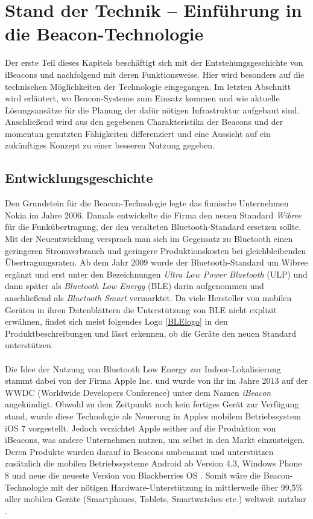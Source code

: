 \chapter{Stand der Technik -- Einführung in die Beacon-Technologie}
Der erste Teil dieses Kapitels beschäftigt sich mit der Entstehungsgeschichte von iBeacons und nachfolgend mit deren Funktionsweise. Hier wird besonders auf die technischen Möglichkeiten der Technologie eingegangen. Im letzten Abschnitt wird erläutert, wo Beacon-Systeme zum Einsatz kommen und wie aktuelle Lösungsansätze für die Planung der dafür nötigen Infrastruktur aufgebaut sind. Anschließend wird aus den gegebenen Charakteristika der Beacons und der momentan genutzten Fähigkeiten differenziert und eine Aussicht auf ein zukünftiges Konzept zu einer besseren Nutzung gegeben.
\section{Entwicklungsgeschichte}
Den Grundstein für die Beacon-Technologie legte das finnische Unternehmen Nokia im Jahre 2006. Damals entwickelte die Firma den neuen Standard \textit{Wibree} für die Funkübertragung, der den veralteten Bluetooth-Standard ersetzen sollte. Mit der Neuentwicklung versprach man sich im Gegensatz zu Bluetooth einen geringeren Stromverbrauch und geringere Produktionskosten bei gleichbleibenden Übertragungsraten. Ab dem Jahr 2009 wurde der Bluetooth-Standard um Wibree ergänzt und erst unter den Bezeichnungen \textit{Ultra Low Power Bluetooth} (ULP) und dann später als \textit{Bluetooth Low Energy} (BLE) darin aufgenommen \cite{Wib2BLE} und anschließend als \textit{Bluetooth Smart} vermarktet. Da viele Hersteller von mobilen Geräten in ihren Datenblättern die Unterstützung von BLE nicht explizit erwähnen, findet sich meist folgendes Logo \ref{BLElogo} in den Produktbeschreibungen und lässt erkennen, ob die Geräte den neuen Standard unterstützen. \\ \\
Die Idee der Nutzung von Bluetooth Low Energy zur Indoor-Lokalisierung stammt dabei von der Firma Apple Inc. und wurde von ihr im Jahre 2013 auf der WWDC (Worldwide Developers Conference)\cite{Apple} unter dem Namen \textit{iBeacon} angekündigt. Obwohl zu dem Zeitpunkt noch kein fertiges Gerät zur Verfügung stand, wurde diese Technologie als Neuerung in Apples mobilem Betriebssystem iOS 7 vorgestellt. Jedoch verzichtet Apple seither auf die Produktion von iBeacons, was andere Unternehmen nutzen, um selbst in den Markt einzusteigen. Deren Produkte wurden darauf in Beacons umbenannt und unterstützen zusätzlich die mobilen Betriebssysteme Android ab Version 4.3, Windows Phone 8 und neue die neueste Version von Blackberries OS \cite{Bibel}. Somit wäre die Beacon-Technologie mit der nötigen Hardware-Unterstützung in mittlerweile über 99,5\% aller mobilen Geräte (Smartphones, Tablets, Smartwatches etc.) weltweit nutzbar \cite{MobGerSt}. \par\bigskip
